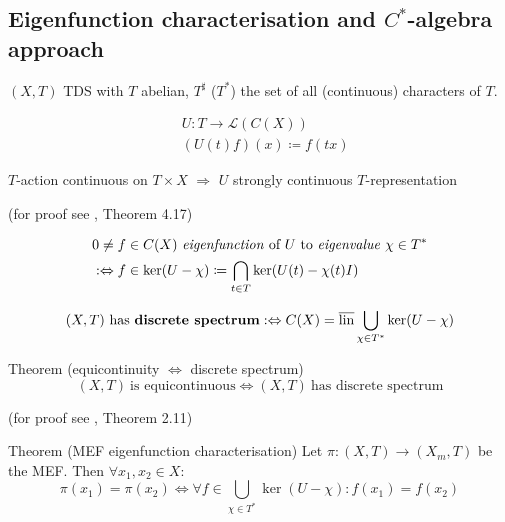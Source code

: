 \subsection{Eigenfunction characterisation and $C^*$-algebra approach}
\begin{frame}
  $(X,T)$ TDS with $T$ abelian, $T^\sharp$ ($T^*$) the set of all (continuous) characters of $T$.
\begin{definition}
  \begin{equation*}
    \begin{split}
      &U : T \longrightarrow \mathscr{L}(C(X)) \\
      &(U(t) f)(x) \coloneq f(tx)
    \end{split}
  \end{equation*}
   \end{definition}
   \begin{remark}
    $T$-action continuous on $T \times X$ $\Rightarrow$ $U$ strongly continuous $T$-representation

    \hfill(for proof see \cite{OpThErg}, Theorem 4.17)
   \end{remark}
   \pause
   \begin{definition}
   \begin{equation*}
    \begin{split}
      &0 \neq f \in C(X) \ \text{\emph{eigenfunction} of} \ U \ \text{to \emph{eigenvalue}} \ \chi \in T^*   \\
 &:\Leftrightarrow f \in \ker (U-\chi)\coloneq \bigcap_{t \in T} \ker (U(t)- \chi (t)I)
    \end{split}
      \end{equation*}
   \end{definition}
\end{frame}
\begin{frame}[fragile]
 \begin{definition}
  \begin{equation*}
    (X,T) \ \text{has \textbf{discrete spectrum}}:\Leftrightarrow C(X) = \overline{\operatorname{lin}} \bigcup_{\chi \in T^*} \ker (U- \chi)
  \end{equation*}
\end{definition}
\pause 
  \begin{alertblock}{Theorem (equicontinuity $\Leftrightarrow$ discrete spectrum)}%
  \begin{equation*}
    (X,T) \ \text{is equicontinuous} \Leftrightarrow (X,T) \ \text{has discrete spectrum}
  \end{equation*}

    \hfill(for proof see \cite{HK2023}, Theorem 2.11)
\end{alertblock}
\pause
  \begin{alertblock}{Theorem (MEF eigenfunction characterisation)}
  \label{thm:MEF_EFchar}
  Let $\pi : (X,T) \to (X_m,T)$ be the MEF.
  Then $\forall x_1, x_2 \in X$:
  \begin{equation*}
  \pi (x_1) = \pi (x_2) \Leftrightarrow 
    \forall f \in \bigcup_{\chi \in T^*} \ker (U- \chi) : f(x_1) = f(x_2)
  \end{equation*}
\end{alertblock}
\end{frame}
